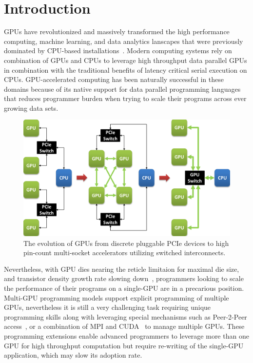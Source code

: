 \section{Introduction}
\label{introduction}

GPUs have revolutionized and massively transformed the high
performance computing, machine learning, and data analytics lanscapes that were
previously dominated by CPU-based
installations~\cite{pascal,intersect360,cudnn,Lavin15b,SimonyanZ14a}. Modern
computing systems rely on combination of GPUs and CPUs to leverage high
throughput data parallel GPUs in combination with the traditional benefits of
latency critical serial execution on CPUs. GPU-accelerated computing has been
naturally successful in these domains because of its native support for data parallel
programming languages~\cite{CUDA7,OPENCL} that reduces programmer burden when
trying to scale their programs across ever growing data sets.

\begin{figure}[t]
\centering
\includegraphics[width=1.0\columnwidth]{figures/inter_gpu_connections.pdf}
\caption{The evolution of GPUs from discrete pluggable PCIe devices to high pin-count 
multi-socket accelerators utilizing switched interconnects.}
\label{fig:systemdiagram}
\vspace{-.15in}
\end{figure}

Nevertheless, with GPU dies nearing the reticle limitaion for maximal die size, and transistor
density growth rate slowing down~\cite{mooredead2016}, programmers looking to
scale the performance of their programs on a single-GPU are in a precarious
position. Multi-GPU programming models support explicit programming of multiple GPUs,
nevertheless it is still a very challenging task requiring unique programming skills
along with leveraging special mechanisms such as Peer-2-Peer
access~\cite{NVIDIAP2P}, or a combination of MPI and CUDA~\cite{NVIDIAMPI} to
manage multiple GPUs. These programming extensions enable advanced programmers
to leverage more than one GPU for high throughput computation but require
re-writing of the single-GPU application, which may slow its adoption rate. 

